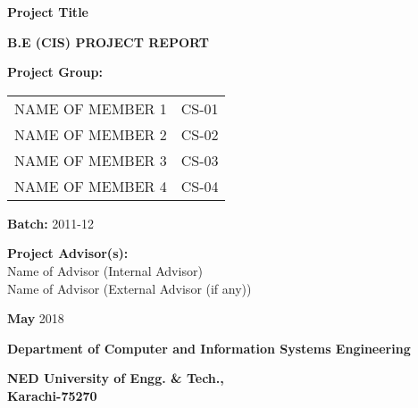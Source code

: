 \begin{titlepage}

  \centering
  
  {\Large\textbf{Project Title}}
  
  \vspace{2cm}
  {\large\textbf{B.E (CIS) PROJECT REPORT}}
  \vspace{2cm}
  
  \textbf{Project Group:}
  \begin{table}[ht]
    \centering
    \begin{tabular}{l l}
      NAME OF MEMBER 1 & CS-01 \\
      NAME OF MEMBER 2 & CS-02 \\
      NAME OF MEMBER 3 & CS-03 \\
      NAME OF MEMBER 4 & CS-04 \\
    \end{tabular}
  \end{table}
 
  \textbf{Batch:} 2011-12
  \vspace{2cm}

  {\large\textbf{Project Advisor(s):}\\
  Name of Advisor (Internal Advisor)\\
  Name of Advisor (External Advisor (if any))}
  \vspace{1cm}

  \textbf{May} 2018
  
  \vfill
  \textbf{Department of Computer and Information Systems Engineering}
  \vspace{1cm}

  \textbf{NED University of Engg. \& Tech.,\\Karachi-75270}
\end{titlepage}
